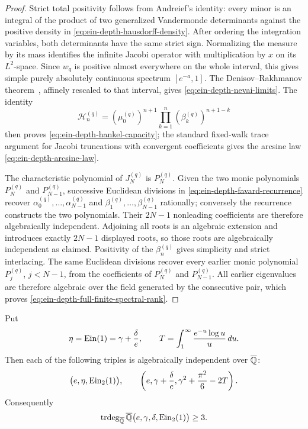 \begin{proof}
Strict total positivity follows from Andreief's identity: every minor is
an integral of the product of two generalized Vandermonde determinants
against the positive density in
\eqref{eq:ein-depth-hausdorff-density}.  After ordering the integration
variables, both determinants have the same strict sign.  Normalizing the
measure by its mass identifies the infinite Jacobi operator with
multiplication by \(x\) on its \(L^2\)-space.  Since \(w_q\) is positive
almost everywhere on the whole interval, this gives simple purely
absolutely continuous spectrum \([e^{-a},1]\).  The
Denisov--Rakhmanov theorem~\cite{Denisov2004}, affinely rescaled to that
interval, gives \eqref{eq:ein-depth-nevai-limits}.  The identity
\[
 \mathcal H_n^{(q)}
 =(\mu_0^{(q)})^{n+1}
   \prod_{k=1}^n(\beta_k^{(q)})^{n+1-k}
\]
then proves \eqref{eq:ein-depth-hankel-capacity}; the standard fixed-walk
trace argument for Jacobi truncations with convergent coefficients gives
the arcsine law \eqref{eq:ein-depth-arcsine-law}.

The characteristic polynomial of \(J_N^{(q)}\) is \(P_N^{(q)}\).  Given
the two monic polynomials \(P_N^{(q)}\) and \(P_{N-1}^{(q)}\), successive
Euclidean divisions in \eqref{eq:ein-depth-favard-recurrence} recover
\(\alpha_0^{(q)},\ldots,\alpha_{N-1}^{(q)}\) and
\(\beta_1^{(q)},\ldots,\beta_{N-1}^{(q)}\) rationally; conversely the
recurrence constructs the two polynomials.  Their \(2N-1\) nonleading
coefficients are therefore algebraically independent.  Adjoining all
roots is an algebraic extension and introduces exactly \(2N-1\) displayed
roots, so those roots are algebraically independent as claimed.  Positivity
of the \(\beta_n^{(q)}\) gives simplicity and strict interlacing.
The same Euclidean divisions recover every earlier monic polynomial
\(P_j^{(q)}\), \(j<N-1\), from the coefficients of
\(P_N^{(q)}\) and \(P_{N-1}^{(q)}\).  All earlier eigenvalues are
therefore algebraic over the field generated by the consecutive pair,
which proves \eqref{eq:ein-depth-full-finite-spectral-rank}.
\end{proof}

\begin{corollary}
\label{cor:ein-depth-basel}
Put
\[
 \eta=\operatorname{Ein}(1)=\gamma+\frac{\delta}{e},\qquad
 T=\int_1^\infty\frac{e^{-u}\log u}{u}\,du.
\]
Then each of the following triples is algebraically independent over
\(\overline{\mathbb Q}\):
\begin{equation}\label{eq:ein-depth-basel-independent-triples}
 \bigl(e,\eta,\operatorname{Ein}_{2}(1)\bigr),
 \qquad
 \left(e,\gamma+\frac{\delta}{e},
       \gamma^2+\frac{\pi^2}{6}-2T\right).
\end{equation}
Consequently
\begin{equation}\label{eq:ein-depth-gamma-delta-lower-bound}
 \operatorname{trdeg}_{\overline{\mathbb Q}}
 \overline{\mathbb Q}\bigl(e,\gamma,\delta,\operatorname{Ein}_{2}(1)\bigr)\geq3.
\end{equation}
\end{corollary}

